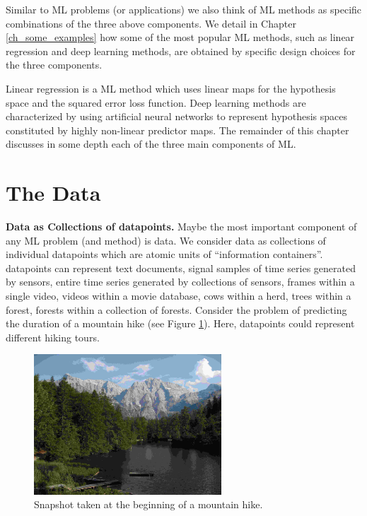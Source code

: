 \documentclass[12pt]{report}
\begin{document}
Similar to ML problems (or applications) we also think of ML 
methods as specific combinations of the three above components. 
We detail in Chapter \ref{ch_some_examples} how some of the 
most popular ML methods, such as linear regression and deep 
learning methods, are obtained by specific design choices for 
the three components. 

Linear regression is a ML method which uses linear maps for 
the hypothesis space and the squared error loss function. 
Deep learning methods are characterized by using artificial 
neural networks to represent hypothesis spaces constituted 
by highly non-linear predictor maps. The remainder of this 
chapter discusses in some depth each of the three main 
components of ML. 





\section{The Data}
\label{sec_the_data}

{\bf Data as Collections of datapoints.} Maybe the most important 
component of any ML problem (and method) is data. We consider 
data as collections of individual datapoints which are atomic units 
of ``information containers''. datapoints can represent text documents, 
signal samples of time series generated by sensors, entire time series 
generated by collections of sensors, frames within a single video, 
videos within a movie database, cows within a herd, trees within a 
forest, forests within a collection of forests. Consider the problem 
of predicting the duration of a mountain hike (see Figure \ref{fig:image}). 
Here, datapoints could represent different hiking tours.  

\begin{figure}[htbp]
	\centering
	\includegraphics[width=7cm]{BergSee1.jpg}
	\caption{Snapshot taken at the beginning of a mountain hike.}
	\label{fig:image}
\end{figure}
\end{document}
